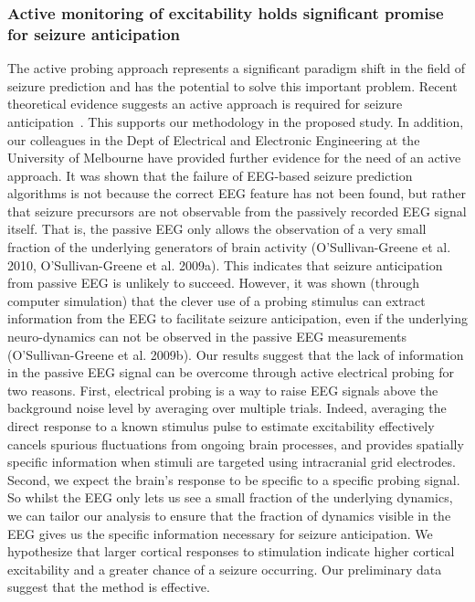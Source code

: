 \documentclass[]{article}
\begin{document}
\subsubsection{Active monitoring of excitability holds significant promise for seizure anticipation}
The active probing approach represents a significant paradigm shift in the field of seizure prediction and has the potential to solve this important problem. Recent theoretical evidence suggests an active approach is required for seizure anticipation~\cite{Suffczynski2008}. This supports our methodology in the proposed study. In addition, our colleagues in the Dept of Electrical and Electronic Engineering at the University of Melbourne have provided further evidence for the need of an active approach. It was shown that the failure of EEG-based seizure prediction algorithms is not because the correct EEG feature has not been found, but rather that seizure precursors are not observable from the passively recorded EEG signal itself.  That is, the passive EEG only allows the observation of a very small fraction of the underlying generators of brain activity (O’Sullivan-Greene et al. 2010, O’Sullivan-Greene et al. 2009a). This indicates that seizure anticipation from passive EEG is unlikely to succeed. However, it was shown (through computer simulation) that the clever use of a probing stimulus can extract information from the EEG to facilitate seizure anticipation, even if the underlying neuro-dynamics can not be observed in the passive EEG measurements (O’Sullivan-Greene et al. 2009b). 
Our results suggest that the lack of information in the passive EEG signal can be overcome through active electrical probing for two reasons. First, electrical probing is a way to raise EEG signals above the background noise level by averaging over multiple trials. Indeed, averaging the direct response to a known stimulus pulse to estimate excitability effectively cancels spurious fluctuations from ongoing brain processes, and provides spatially specific information when stimuli are targeted using intracranial grid electrodes. Second, we expect the brain’s response to be specific to a specific probing signal.  So whilst the EEG only lets us see a small fraction of the underlying dynamics, we can tailor our analysis to ensure that the fraction of dynamics visible in the EEG gives us the specific information necessary for seizure anticipation.
We hypothesize that larger cortical responses to stimulation indicate higher cortical excitability and a greater chance of a seizure occurring. Our preliminary data suggest that the method is effective.
\end{document}
